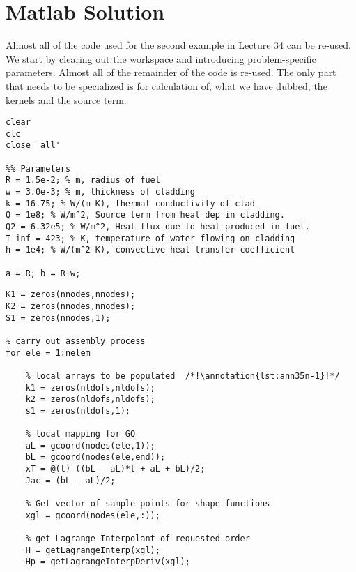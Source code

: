 \section{Matlab Solution}
Almost all of the code used for the second example in Lecture 34 can be re-used.  We start by clearing out the workspace and introducing problem-specific parameters.  Almost all of the remainder of the code is re-used.  The only part that needs to be specialized is for calculation of, what we have dubbed, the kernels and the source term.  



\begin{lstlisting}[style=myMatlab,name=lec35n-ex]
clear
clc
close 'all'

%% Parameters
R = 1.5e-2; % m, radius of fuel
w = 3.0e-3; % m, thickness of cladding
k = 16.75; % W/(m-K), thermal conductivity of clad
Q = 1e8; % W/m^2, Source term from heat dep in cladding.
Q2 = 6.32e5; % W/m^2, Heat flux due to heat produced in fuel.
T_inf = 423; % K, temperature of water flowing on cladding
h = 1e4; % W/(m^2-K), convective heat transfer coefficient

a = R; b = R+w;
\end{lstlisting}

\begin{lstlisting}[style=myMatlab,name=lec35n-ex]
% initialize global arrays
K1 = zeros(nnodes,nnodes);
K2 = zeros(nnodes,nnodes);
S1 = zeros(nnodes,1);

% carry out assembly process
for ele = 1:nelem

    % local arrays to be populated  /*!\annotation{lst:ann35n-1}!*/
    k1 = zeros(nldofs,nldofs);
    k2 = zeros(nldofs,nldofs);
    s1 = zeros(nldofs,1);
    
    % local mapping for GQ
    aL = gcoord(nodes(ele,1));
    bL = gcoord(nodes(ele,end));
    xT = @(t) ((bL - aL)*t + aL + bL)/2;
    Jac = (bL - aL)/2;

    % Get vector of sample points for shape functions
    xgl = gcoord(nodes(ele,:));
    
    % get Lagrange Interpolant of requested order
    H = getLagrangeInterp(xgl);
    Hp = getLagrangeInterpDeriv(xgl);
\end{lstlisting}

